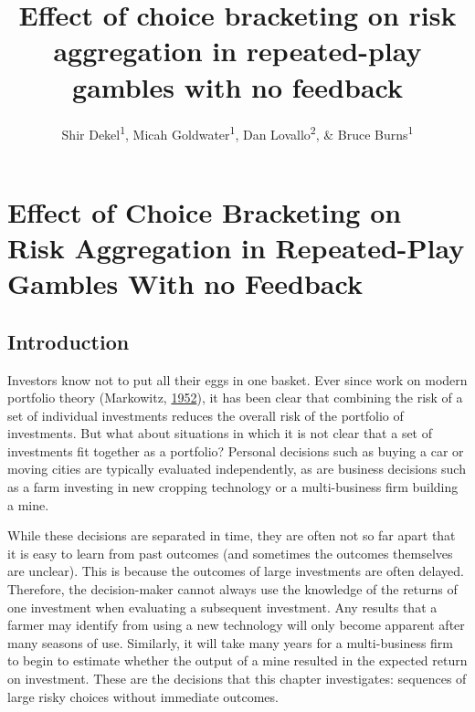 \documentclass[
  english,
  man, donotrepeattitle,floatsintext]{apa7}
\title{Effect of choice bracketing on risk aggregation in repeated-play gambles with no feedback}
\author{Shir Dekel\textsuperscript{1}, Micah Goldwater\textsuperscript{1}, Dan Lovallo\textsuperscript{2}, \& Bruce Burns\textsuperscript{1}}
\date{}
\affiliation{\vspace{0.5cm}\textsuperscript{1} The University of Sydney, School of Psychology\\\textsuperscript{2} The University of Sydney, Business School}
\theoremstyle{definition}
\theoremstyle{definition}
\theoremstyle{definition}
\theoremstyle{definition}
\theoremstyle{remark}
\begin{document}
\maketitle





















\hypertarget{aggregation}{%
\section{Effect of Choice Bracketing on Risk Aggregation in Repeated-Play Gambles With no Feedback}\label{aggregation}}

\hypertarget{introduction}{%
\subsection{Introduction}\label{introduction}}

Investors know not to put all their eggs in one basket. Ever since work on
modern portfolio theory (Markowitz, \protect\hyperlink{ref-markowitz1952}{1952}), it has been clear that combining the
risk of a set of individual investments reduces the overall risk of the
portfolio of investments. But what about situations in which it is not clear
that a set of investments fit together as a portfolio? Personal decisions such
as buying a car or moving cities are typically evaluated independently, as are
business decisions such as a farm investing in new cropping technology or a
multi-business firm building a mine.

While these decisions are separated in time, they are often not so far apart
that it is easy to learn from past outcomes (and sometimes the outcomes
themselves are unclear). This is because the outcomes of large investments are
often delayed. Therefore, the decision-maker cannot always use the knowledge of
the returns of one investment when evaluating a subsequent investment. Any
results that a farmer may identify from using a new technology will only become
apparent after many seasons of use. Similarly, it will take many years for a
multi-business firm to begin to estimate whether the output of a mine resulted
in the expected return on investment. These are the decisions that this chapter
investigates: sequences of large risky choices without immediate outcomes.
\end{document}
